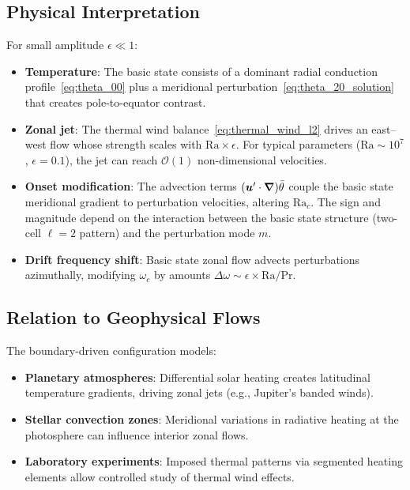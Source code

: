 \documentclass[11pt]{article}
\numberwithin{equation}{section}
\begin{document}
\subsection{Physical Interpretation}

For small amplitude $\epsilon \ll 1$:
\begin{itemize}
  \item \textbf{Temperature}: The basic state consists of a dominant radial conduction profile~\eqref{eq:theta_00} plus a meridional perturbation~\eqref{eq:theta_20_solution} that creates pole-to-equator contrast.

  \item \textbf{Zonal jet}: The thermal wind balance~\eqref{eq:thermal_wind_l2} drives an east--west flow whose strength scales with $\mathrm{Ra} \times \epsilon$. For typical parameters ($\mathrm{Ra} \sim 10^7$, $\epsilon=0.1$), the jet can reach $\mathcal{O}(1)$ non-dimensional velocities.

  \item \textbf{Onset modification}: The advection terms $(\bm{u}' \cdot \grad)\bar{\theta}$ couple the basic state meridional gradient to perturbation velocities, altering $\mathrm{Ra}_c$. The sign and magnitude depend on the interaction between the basic state structure (two-cell $\ell=2$ pattern) and the perturbation mode $m$.

  \item \textbf{Drift frequency shift}: Basic state zonal flow advects perturbations azimuthally, modifying $\omega_c$ by amounts $\Delta\omega \sim \epsilon \times \mathrm{Ra}/\mathrm{Pr}$.
\end{itemize}

\subsection{Relation to Geophysical Flows}

The boundary-driven configuration models:
\begin{itemize}
  \item \textbf{Planetary atmospheres}: Differential solar heating creates latitudinal temperature gradients, driving zonal jets (e.g., Jupiter's banded winds).
  \item \textbf{Stellar convection zones}: Meridional variations in radiative heating at the photosphere can influence interior zonal flows.
  \item \textbf{Laboratory experiments}: Imposed thermal patterns via segmented heating elements allow controlled study of thermal wind effects.
\end{itemize}
\end{document}
